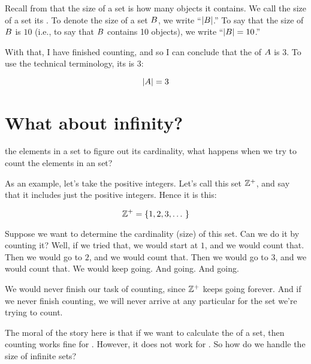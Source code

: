 \documentclass[../../../main.tex]{subfiles}
\begin{document}
\begin{aside}
  \begin{remark}
    Recall from  that the size of a set is how many objects it contains. We call the size of a set its . To denote the size of a set $B$, we write ``$|B|$.'' To say that the size of $B$ is $10$ (i.e., to say that $B$ contains 10 objects), we write ``$|B| = 10$.''
  \end{remark}
\end{aside}

With that, I have finished counting, and so I can conclude that the  of $A$ is $3$. To use the technical terminology, its  is 3:

\begin{equation*}
  |A| = 3
\end{equation*}


\section{What about infinity?}

 the elements in a set to figure out its cardinality, what happens when we try to count the elements in an  set? 

As an example, let's take the positive integers. Let's call this set $\PositiveInts/$, and say that it includes just the positive integers. Hence it is this:

\begin{equation*}
  \PositiveInts/ = \{ 1, 2, 3, \ldots ~\}
\end{equation*}

Suppose we want to determine the cardinality (size) of this set. Can we do it by counting it? Well, if we tried that, we would start at $1$, and we would count that. Then we would go to $2$, and we would count that. Then we would go to $3$, and we would count that. We would keep going. And going. And going.

We would never finish our task of counting, since $\PositiveInts/$ keeps going forever. And if we never finish counting, we will never arrive at any particular  for the set we're trying to count.

The moral of the story here is that if we want to calculate the  of a set, then counting works fine for . However, it does not work for . So how do we handle the size of infinite sets?
\end{document}
